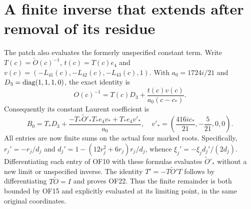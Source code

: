 \section{A finite inverse that extends after removal of its residue}
The patch also evaluates the formerly unspecified constant term.
Write $T(c)=\widetilde O(c)^{-1}$, $t(c)=T(c)e_4$ and
$v(c)=(-L_{41}(c),-L_{42}(c),-L_{43}(c),1)$.
With $a_0=1724i/21$ and $D_3=\operatorname{diag}(1,1,1,0)$, the exact identity is
\begin{equation}
 O(c)^{-1}=T(c)D_3+\frac{t(c)v(c)}{a_0(c-c_*)}.\tag{OF21}
\end{equation}
Consequently its constant Laurent coefficient is
\begin{equation}
 B_0=T_*D_3+
 \frac{-T_*\widetilde O'_*T_*e_4v_*+T_*e_4v'_*}{a_0},
 \quad
 v'_*=\left(\frac{416ic_*}{21},-\frac5{21},0,0\right).
 \tag{OF22}
\end{equation}
All entries are now finite sums on the actual four marked roots.
Specifically, $r_j'=-r_j/d_j$ and
$d_j'=1-(12r_j^2+6r_j)r_j/d_j$, whence
$\xi_j'=-\xi_jd_j'/(2d_j)$. Differentiating each entry of OF10
with these formulas evaluates $\widetilde O'_*$ without a new
limit or unspecified inverse. The identity $T'=-T\widetilde O'T$
follows by differentiating $T\widetilde O=I$ and proves OF22.
Thus the finite remainder is both bounded by OF15 and explicitly
evaluated at its limiting point, in the same original coordinates.


